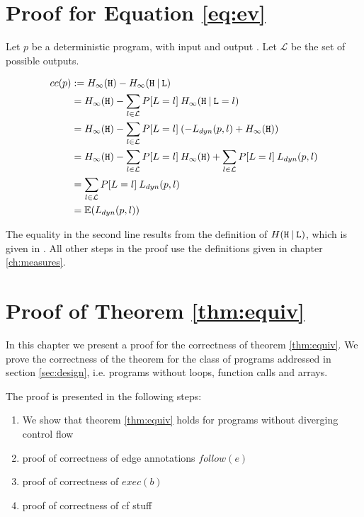 \chapter{Proof for Equation \ref{eq:ev}}

Let $p$ be a deterministic program, with input \In and output \Out. Let $\mathcal{L}$ be the set of possible outputs.

\begin{align*}
    cc(p) &:= H_\infty(\mathtt{H}) - H_\infty(\mathtt{H} \: | \: \mathtt{L}) \\
    &= H_\infty(\mathtt{H}) - \sum\limits_{l \in \mathcal{L}} P[L = l]\: H_\infty(\mathtt{H} \: | \: \mathtt{L} = l) \\
    &= H_\infty(\mathtt{H}) - \sum\limits_{l \in \mathcal{L}} P[L = l]\: (-L_{dyn}(p, l) + H_\infty(\mathtt{H})) \\
    &= H_\infty(\mathtt{H}) - \sum\limits_{l \in \mathcal{L}} P[L = l]\: H_\infty(\mathtt{H}) + \sum\limits_{l \in \mathcal{L}} P[L = l]\: L_{dyn}(p, l) \\
    &= \sum\limits_{l \in \mathcal{L}} P[L = l] \: L_{dyn}(p, l) \\
    &= \mathbb{E}(L_{dyn}(p,l))
\end{align*}

The equality in the second line results from the definition of $H( \mathtt{H} \: |\: \mathtt{L})$, which is given in \cite{smith09}. All other steps in the proof use the definitions given in chapter \ref{ch:measures}.

\chapter{Proof of Theorem \ref{thm:equiv}}\label{ch:proofEquiv}


In this chapter we present a proof for the correctness of theorem \ref{thm:equiv}. We prove the correctness of the theorem for the class of programs addressed in section \ref{sec:design}, i.e. programs without loops, function calls and arrays.

The proof is presented in the following steps:
\begin{enumerate}
    \setlength\itemsep{0em}
    \item We show that theorem \ref{thm:equiv} holds for programs without diverging control flow
    \item proof of correctness of edge annotations $follow(e)$
    \item proof of correctness of $exec(b)$
    \item proof of correctness of cf stuff
\end{enumerate}

